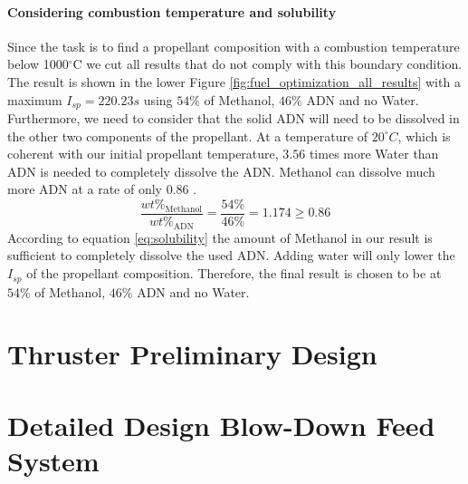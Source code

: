 \documentclass[12pt]{article}
\begin{document}
\paragraph{Considering combustion temperature and solubility}
Since the task is to find a propellant composition with a combustion temperature below 1000$^\circ$C we cut all results that do not comply with this boundary condition. The result is shown in the lower Figure \ref{fig:fuel_optimization_all_results} with a maximum $I_{sp}=220.23s$ using $54\%$ of Methanol, $46\%$ ADN and no Water.\\

Furthermore, we need to consider that the solid ADN will need to be dissolved in the other two components of the propellant. At a temperature of $20^\circ C$, which is coherent with our initial propellant temperature, $3.56$ times more Water than ADN is needed to completely dissolve the ADN. Methanol can dissolve much more ADN at a rate of only $0.86$ \cite{Larsson2011}. 
\begin{equation}
	\frac{wt\%_{\text{Methanol}}}{wt\%_{\text{ADN}}} = \frac{54\%}{46\%} = 1.174 \geq 0.86
	\label{eq:solubility}
\end{equation}
According to equation \ref{eq:solubility} the amount of Methanol in our result is sufficient to completely dissolve the used ADN. Adding water will only lower the $I_{sp}$ of the propellant composition. Therefore, the final result is chosen to be at $54\%$ of Methanol, $46\%$ ADN and no Water.



\section{Thruster Preliminary Design}

\section{Detailed Design Blow-Down Feed System}
\end{document}
